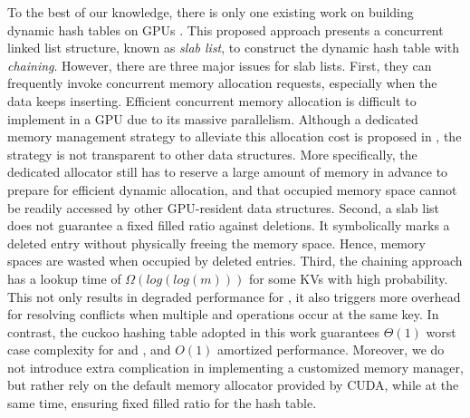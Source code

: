 To the best of our knowledge, there is only one existing work on building dynamic hash tables on GPUs \cite{ashkiani2018dynamic}.
This proposed approach presents a concurrent linked list structure, known as \emph{slab list}, to construct the dynamic hash table with \emph{chaining}. 
However, there are three major issues for slab lists.
First, they can frequently invoke concurrent memory allocation requests, especially when the data keeps inserting. Efficient concurrent memory allocation is difficult to implement in a GPU due to its massive parallelism. Although a dedicated memory management strategy to alleviate this allocation cost is proposed in \cite{ashkiani2018dynamic}, the strategy is not transparent to other data structures. More specifically, the dedicated allocator still has to reserve a large amount of memory in advance to prepare for efficient dynamic allocation, and that occupied memory space cannot be readily accessed by other GPU-resident data structures. 
Second, a slab list does not guarantee a fixed filled ratio against deletions. 
It symbolically marks a deleted entry without physically freeing the memory space. 
Hence, memory spaces are wasted when occupied by deleted entries. 
Third, the chaining approach has a lookup time of $\Omega(log(log(m)))$ for some KVs with high probability. This not only results in degraded performance for , it also triggers more overhead for resolving conflicts when multiple  and  operations occur at the same key.
In contrast, the cuckoo hashing table adopted in this work guarantees $\Theta(1)$ worst case complexity for  and , 
and $O(1)$ amortized  performance. Moreover, we do not introduce extra complication in implementing a customized memory manager, but rather rely on the default memory allocator provided by CUDA, while at the same time, ensuring fixed filled ratio for the hash table.